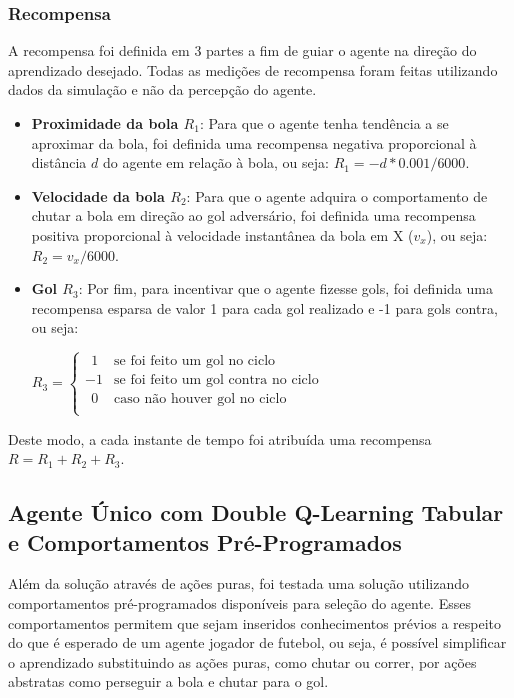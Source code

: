 \subsubsection{Recompensa}
\label{subsubsec:reward}

A recompensa foi definida em 3 partes a fim de guiar o agente na direção do aprendizado desejado. Todas as medições de recompensa foram feitas utilizando dados da simulação e não da percepção do agente.

\begin{itemize}
	\item \textbf{Proximidade da bola $R_1$}: Para que o agente tenha tendência a se aproximar da bola, foi definida uma recompensa negativa proporcional à distância $d$ do agente em relação à bola, ou seja: $R_1 = -d*0.001/6000$.
	
	\item \textbf{Velocidade da bola $R_2$}: Para que o agente adquira o comportamento de chutar a bola em direção ao gol adversário, foi definida uma recompensa positiva proporcional à velocidade instantânea da bola em X ($v_x$), ou seja: $R_2 = v_x/6000$.
	
	\item \textbf{Gol $R_3$}: Por fim, para incentivar que o agente fizesse gols, foi definida uma recompensa esparsa de valor 1 para cada gol realizado e -1 para gols contra, ou seja:
	
	$
	R_3 =
	\left\{
	\begin{array}{ll}
		\ \ 1  & \mbox{se foi feito um gol no ciclo} \\
		-1  & \mbox{se foi feito um gol contra no ciclo} \\
		\ \ 0  & \mbox{caso não houver gol no ciclo} \\
	\end{array}
	\right.
	$
\end{itemize}

Deste modo, a cada instante de tempo foi atribuída uma recompensa $R = R_1 + R_2 + R_3$.

\subsection{Agente Único com Double Q-Learning Tabular e Comportamentos Pré-Programados}

Além da solução através de ações puras, foi testada uma solução utilizando comportamentos pré-programados disponíveis para seleção do agente. Esses comportamentos permitem que sejam inseridos conhecimentos prévios a respeito do que é esperado de um agente jogador de futebol, ou seja, é possível simplificar o aprendizado substituindo as ações puras, como chutar ou correr, por ações abstratas como perseguir a bola e chutar para o gol.


